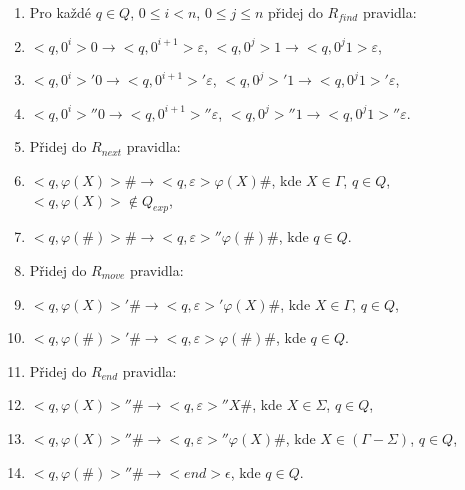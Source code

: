 \begin{Alg}
\begin{list}{}{\setlength\parsep{0cm} \setlength\itemsep{0cm} \setlength\leftmargin{1em}}
\begin{enumerate}

  \item Pro každé $q \in Q$, $0 \le i < n$, $0 \le j \le n$ přidej do $R_{find}$ pravidla:

\renewcommand{\labelenumi}{(\roman{enumi})}

  \item $<q, 0^i> 0 \rightarrow <q, 0^{i+1}> \varepsilon $, $<q, 0^j> 1 \rightarrow <q, 0^j 1> \varepsilon $,
  \item $<q, 0^i>' 0 \rightarrow <q, 0^{i+1}>' \varepsilon $, $<q, 0^j>' 1 \rightarrow <q, 0^j 1>' \varepsilon $,
  \item $<q, 0^i>'' 0 \rightarrow <q, 0^{i+1}>'' \varepsilon $, $<q, 0^j>'' 1 \rightarrow <q, 0^j 1>'' \varepsilon $.



  \item Přidej do $R_{next}$ pravidla:

\renewcommand{\labelenumi}{(\roman{enumi})}

  \item $<q, \varphi(X)> \# \rightarrow <q, \varepsilon> \varphi(X) \# $, kde $X \in \Gamma$, $q \in Q$, $<q, \varphi(X)> \notin Q_{exp}$,
  \item $<q, \varphi(\#) > \# \rightarrow <q, \varepsilon>'' \varphi(\#) \# $, kde $q \in Q$.


  \item Přidej do $R_{move}$ pravidla:

\renewcommand{\labelenumi}{(\roman{enumi})}

  \item $<q, \varphi(X)>' \# \rightarrow <q, \varepsilon>' \varphi(X) \# $, kde $X \in \Gamma$, $q \in Q$,
  \item $<q, \varphi(\#) >' \# \rightarrow <q, \varepsilon> \varphi(\#) \# $, kde $q \in Q$.


  \item Přidej do $R_{end}$ pravidla:

\renewcommand{\labelenumi}{(\roman{enumi})}

  \item $<q, \varphi(X) >'' \# \rightarrow <q, \varepsilon>'' X \# $, kde $X \in \Sigma$, $q \in Q$,
  \item $<q, \varphi(X) >'' \# \rightarrow <q, \varepsilon>'' \varphi(X) \# $, kde $X \in (\Gamma - \Sigma)$, $q \in Q$,
  \item $<q, \varphi(\#) >'' \# \rightarrow <end> \epsilon $, kde $q \in Q$.

\end{enumerate}

\end{list}
\end{Alg}

